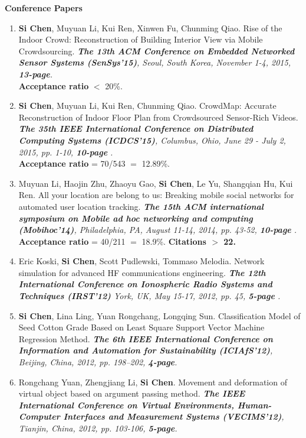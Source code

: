 \documentclass[letter]{article}
\newcommand{\publication}[4]{\item #1. #2. \emph{#3.} #4}
\begin{document}
\begin{description}
\textbf{Conference Papers}

\begin{enumerate}[{C-}1.]

\publication{\textbf{Si Chen}, Muyuan Li, Kui Ren, Xinwen Fu, Chunming Qiao} {Rise of the Indoor Crowd: Reconstruction of Building Interior View via Mobile Crowdsourcing}  {\textbf{The 13th ACM Conference on Embedded Networked Sensor Systems (SenSys'15)}, Seoul, South Korea, November 1-4, 2015, \textbf{13-page}} \\
\textbf{Acceptance ratio} $<$ 20\%.

\publication{\textbf{Si Chen}, Muyuan Li, Kui Ren, Chunming Qiao} {CrowdMap: Accurate Reconstruction of Indoor Floor Plan from Crowdsourced Sensor-Rich Videos}  {\textbf{The 35th IEEE International Conference on Distributed Computing Systems (ICDCS'15)}, Columbus, Ohio, June 29 - July 2, 2015, pp. 1-10, \textbf{10-page }} {} \\
\textbf{Acceptance ratio} = 70/543 $=$ 12.89\%.

\publication{Muyuan Li, Haojin Zhu, Zhaoyu Gao, \textbf{Si Chen}, Le Yu, Shangqian Hu, Kui Ren} {All your location are belong to us: Breaking mobile social networks for automated user location tracking}  {\textbf{The 15th ACM international symposium on Mobile ad hoc networking and computing (Mobihoc'14)}, Philadelphia, PA, August 11-14, 2014, pp. 43-52, \textbf{10-page }} \\
\textbf{Acceptance ratio} = 40/211 $=$ 18.9\%. \textbf{Citations $>$ 22.}

\publication{Eric Koski, \textbf{Si Chen}, Scott Pudlewski, Tommaso Melodia} {Network simulation for advanced HF communications engineering}  {\textbf{The 12th International Conference on Ionospheric Radio Systems and Techniques (IRST'12)} York, UK, May 15-17, 2012, pp. 45, \textbf{5-page }}

\publication{\textbf{Si Chen}, Lina Ling, Yuan Rongchang, Longqing Sun} {Classification Model of Seed Cotton Grade Based on Least Square Support Vector Machine Regression Method}  {\textbf{The 6th IEEE International Conference on Information and Automation for Sustainability (ICIAfS'12)}, Beijing, China, 2012, pp. 198--202, \textbf{4-page}} 

\publication{Rongchang Yuan, Zhengjiang Li, \textbf{Si Chen}} {Movement and deformation of virtual object based on argument passing method}  {\textbf{The IEEE International Conference on Virtual Environments, Human-Computer Interfaces and Measurement Systems (VECIMS'12)}, Tianjin, China, 2012, pp. 103-106, \textbf{5-page}} 


\end{enumerate}
\end{description}
\end{document}
